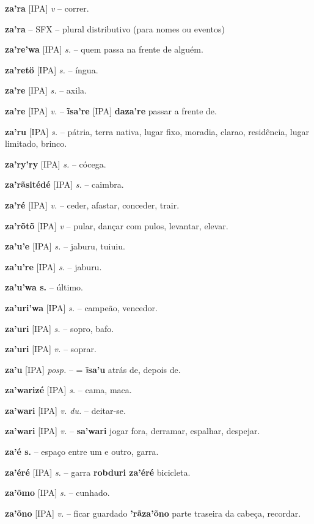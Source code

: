 \textbf{za'ra} [IPA] \textit{v} -- {correr}.

\textbf{za'ra} -- {SFX} -- {plural distributivo (para nomes ou eventos)}

\textbf{za're'wa} [IPA] \textit{s.} -- quem passa na frente de alguém.

\textbf{za'retö} [IPA] \textit{s.} -- íngua.

\textbf{za're} [IPA] \textit{s.} -- axila.

\textbf{za're} [IPA] \textit{v.} -- \textbf{ĩsa're} [IPA] \textbf{daza're} passar a frente de.

\textbf{za'ru} [IPA] \textit{s.} -- pátria, terra nativa, lugar fixo, moradia, clarao, residência, lugar limitado, brinco.

\textbf{za'ry'ry} [IPA] \textit{s.} -- cócega.

\textbf{za'rãsitédé} [IPA] \textit{s.} -- caimbra.

\textbf{za'ré} [IPA] \textit{v.} -- ceder, afastar, conceder, trair.

\textbf{za'rõtõ} [IPA] \textit{v} -- pular, dançar com pulos, levantar, elevar.

\textbf{za'u'e} [IPA] \textit{s.} -- jaburu, tuiuiu.

\textbf{za'u're} [IPA] \textit{s.} -- jaburu.

\textbf{za'u'wa s.} -- último.

\textbf{za'uri'wa} [IPA] \textit{s.} -- campeão, vencedor.

\textbf{za'uri} [IPA] \textit{s.} -- sopro, bafo.

\textbf{za'uri} [IPA] \textit{v.} -- soprar.

\textbf{za'u} [IPA] \textit{posp.} -- = \textbf{ĩsa'u} atrás de, depois de.

\textbf{za'warizé} [IPA] \textit{s.} -- cama, maca.

\textbf{za'wari} [IPA] \textit{v. du.} -- deitar-se.

\textbf{za'wari} [IPA] \textit{v.} -- \textbf{sa'wari} jogar fora, derramar, espalhar, despejar.

\textbf{za'é s.} -- espaço entre um e outro, garra.

\textbf{za'éré} [IPA] \textit{s.} -- garra  \textbf{robduri za'éré} bicicleta.

\textbf{za'õmo} [IPA] \textit{s.} -- cunhado.

\textbf{za'õno} [IPA] \textit{v.} -- ficar guardado  \textbf{'rãza'õno} parte traseira da cabeça, recordar.

